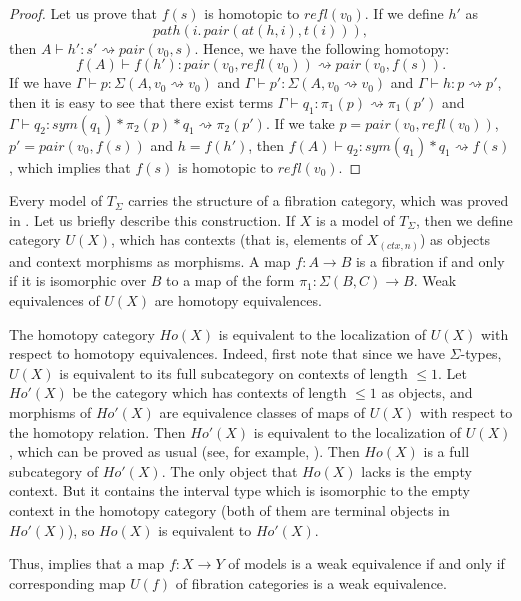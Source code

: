 \documentclass[reqno]{amsart}
\theoremstyle{definition}
\theoremstyle{remark}
\newcommand{\idtype}{\rightsquigarrow}
\numberwithin{figure}{section}
\begin{document}
\begin{proof}
Let us prove that $f(s)$ is homotopic to $refl(v_0)$.
If we define $h'$ as
\[ path(i.\,pair(at(h,i), t(i))), \]
then $A \vdash h' : s' \idtype pair(v_0,s)$.
Hence, we have the following homotopy:
\[ f(A) \vdash f(h') : pair(v_0, refl(v_0)) \idtype pair(v_0, f(s)). \]
If we have $\Gamma \vdash p : \Sigma(A, v_0 \idtype v_0)$ and $\Gamma \vdash p' : \Sigma(A, v_0 \idtype v_0)$ and $\Gamma \vdash h : p \idtype p'$,
then it is easy to see that there exist terms $\Gamma \vdash q_1 : \pi_1(p) \idtype \pi_1(p')$ and $\Gamma \vdash q_2 : sym(q_1) * \pi_2(p) * q_1 \idtype \pi_2(p')$.
If we take $p = pair(v_0, refl(v_0))$, $p' = pair(v_0, f(s))$ and $h = f(h')$, then $f(A) \vdash q_2 : sym(q_1) * q_1 \idtype f(s)$,
which implies that $f(s)$ is homotopic to $refl(v_0)$.
\end{proof}

Every model of $T_\Sigma$ carries the structure of a fibration category, which was proved in \cite{tt-fibr-cat}.
Let us briefly describe this construction.
If $X$ is a model of $T_\Sigma$, then we define category $U(X)$, which has contexts (that is, elements of $X_{(ctx,n)}$) as objects and context morphisms as morphisms.
A map $f : A \to B$ is a fibration if and only if it is isomorphic over $B$ to a map of the form $\pi_1 : \Sigma(B,C) \to B$.
Weak equivalences of $U(X)$ are homotopy equivalences.

The homotopy category $Ho(X)$ is equivalent to the localization of $U(X)$ with respect to homotopy equivalences.
Indeed, first note that since we have $\Sigma$-types, $U(X)$ is equivalent to its full subcategory on contexts of length $\leq 1$.
Let $Ho'(X)$ be the category which has contexts of length $\leq 1$ as objects,
and morphisms of $Ho'(X)$ are equivalence classes of maps of $U(X)$ with respect to the homotopy relation.
Then $Ho'(X)$ is equivalent to the localization of $U(X)$, which can be proved as usual (see, for example, \cite[Corollary~1.2.9]{hovey}).
Then $Ho(X)$ is a full subcategory of $Ho'(X)$.
The only object that $Ho(X)$ lacks is the empty context.
But it contains the interval type which is isomorphic to the empty context in the homotopy category
(both of them are terminal objects in $Ho'(X)$), so $Ho(X)$ is equivalent to $Ho'(X)$.

Thus,  implies that a map $f : X \to Y$ of models is a weak equivalence if and only if
corresponding map $U(f)$ of fibration categories is a weak equivalence.



\end{document}
